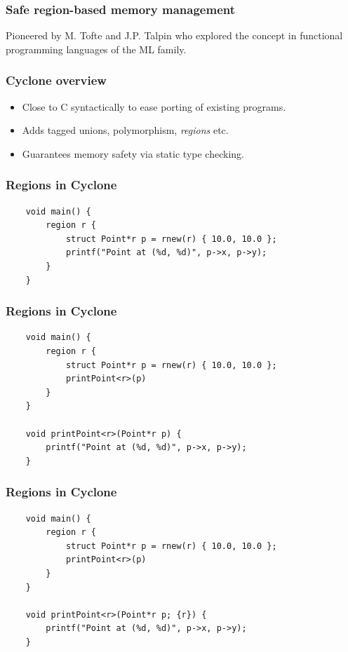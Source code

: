 \begin{frame}
    \frametitle{Safe region-based memory management}

    Pioneered by M. Tofte and J.P. Talpin who explored the concept in functional
    programming languages of the ML family.
\end{frame}

\begin{frame}
    \frametitle{Cyclone overview}
    \begin{itemize}
        \item Close to C syntactically to ease porting of existing programs.
        \item Adds tagged unions, polymorphism, \textit{regions} etc.
        \item Guarantees memory safety via static type checking.
    \end{itemize}
\end{frame}

\begin{frame}[fragile]
    \frametitle{Regions in Cyclone}
    \begin{verbatim}
    void main() {
        region r {
            struct Point*r p = rnew(r) { 10.0, 10.0 };
            printf("Point at (%d, %d)", p->x, p->y);
        }
    }
    \end{verbatim}
\end{frame}

\begin{frame}[fragile]
    \frametitle{Regions in Cyclone}
    \begin{verbatim}
    void main() {
        region r {
            struct Point*r p = rnew(r) { 10.0, 10.0 };
            printPoint<r>(p)
        }
    }

    void printPoint<r>(Point*r p) {
        printf("Point at (%d, %d)", p->x, p->y);
    }
    \end{verbatim}
\end{frame}

\begin{frame}[fragile]
    \frametitle{Regions in Cyclone}
    \begin{verbatim}
    void main() {
        region r {
            struct Point*r p = rnew(r) { 10.0, 10.0 };
            printPoint<r>(p)
        }
    }

    void printPoint<r>(Point*r p; {r}) {
        printf("Point at (%d, %d)", p->x, p->y);
    }
    \end{verbatim}
\end{frame}

